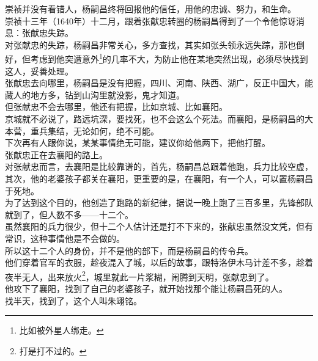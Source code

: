 \begin{multicols}{\theparacolNo}
崇祯并没有看错人，杨嗣昌终将回报他的信任，用他的忠诚、努力，和生命。\\

崇祯十三年（1640年）十二月，跟着张献忠转圈的杨嗣昌得到了一个令他惊讶消息：张献忠失踪。\\

对张献忠的失踪，杨嗣昌非常关心，多方查找，其实如张头领永远失踪，那也倒好，但考虑到他突遭意外\footnote{比如被外星人绑走。}的几率不大，为防止他在某地突然出现，必须尽快找到这人，妥善处理。\\

张献忠去向哪里，杨嗣昌是没有把握，四川、河南、陕西、湖广，反正中国大，能藏人的地方多，钻到山沟里就没影，鬼才知道。\\

但张献忠不会去哪里，他还有把握，比如京城、比如襄阳。\\

京城就不必说了，路远坑深，要找死，也不会这么个死法。而襄阳，是杨嗣昌的大本营，重兵集结，无论如何，绝不可能。\\

下次再有人跟你说，某某事情绝无可能，建议你给他两下，把他打醒。\\

张献忠正在去襄阳的路上。\\

对张献忠而言，去襄阳是比较靠谱的，首先，杨嗣昌总跟着他跑，兵力比较空虚，其次，他的老婆孩子都关在襄阳，更重要的是，在襄阳，有一个人，可以置杨嗣昌于死地。\\

为了达到这个目的，他创造了跑路的新纪律，据说一晚上跑了三百多里，先锋部队就到了，但人数不多——十二个。\\

虽然襄阳的兵力很少，但十二个人估计还是打不下来的，张献忠虽然没文凭，但有常识，这种事情他是不会做的。\\

所以这十二个人的身份，并不是他的部下，而是杨嗣昌的传令兵。\\

他们穿着官军的衣服，趁夜混入了城，以后的故事，跟特洛伊木马计差不多，趁着夜半无人，出来放火\footnote{打是打不过的。}，城里就此一片浆糊，闹腾到天明，张献忠到了。\\

他攻下了襄阳，找到了自己的老婆孩子，就开始找那个能让杨嗣昌死的人。\\

找半天，找到了，这个人叫朱翊铭。\\


\end{multicols}
